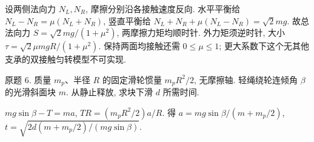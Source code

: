 \begin{solution}
设两侧法向力 $N_L,N_R$, 摩擦分别沿各接触速度反向. 水平平衡给 $N_L-N_R=\mu(N_L+N_R)$, 竖直平衡给 $N_L+N_R+\mu(N_L-N_R)=\sqrt2mg$. 故总法向力 $S=\sqrt2mg/(1+\mu^2)$, 两摩擦力矩均顺时针. 外力矩须逆时针, 大小 $\tau=\sqrt2\mu mgR/(1+\mu^2)$. 保持两面均接触还需 $0\le\mu\le1$; 更大系数下这个无其他支承的双接触匀转模型不可实现.
\end{solution}
\begin{exercise}
原题 6. 质量 $m_p$、半径 $R$ 的固定滑轮惯量 $m_pR^2/2$, 无摩擦轴. 轻绳绕轮连倾角 $\beta$ 的光滑斜面块 $m$. 从静止释放, 求块下滑 $d$ 所需时间.
\end{exercise}
\begin{solution}
$mg\sin\beta-T=ma$, $TR=(m_pR^2/2)a/R$. 得 $a=mg\sin\beta/(m+m_p/2)$, $t=\sqrt{2d(m+m_p/2)/(mg\sin\beta)}$.
\end{solution}
